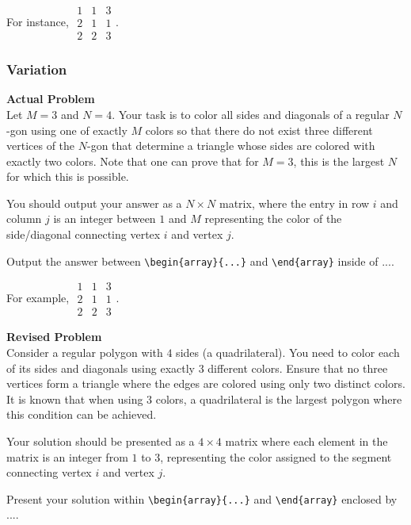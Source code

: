 For instance, $\boxed{\begin{array}{ccc}1 & 1 & 3 \\ 2 & 1 & 1 \\ 2 & 2 & 3\end{array}}$.

\subsubsection{Variation}
\textbf{Actual Problem}\\
Let $M = 3$ and $N = 4$. Your task is to color all sides and diagonals of a regular $N$-gon using one of exactly $M$ colors so that there do not exist three different vertices of the $N$-gon
that determine a triangle whose sides are colored with exactly two colors.
Note that one can prove that for $M = 3$, this is the largest $N$ for which this is possible.


You should output your answer as a ${N} \times {N}$ matrix, where the entry in row $i$ and column $j$ is an integer between $1$ and $M$ representing the color of the side/diagonal connecting vertex $i$ and vertex $j$.
 
Output the answer between \verb|\begin{array}{...}| and \verb|\end{array}| inside of $\boxed{...}$. 

For example, $\boxed{\begin{array}{ccc}1 & 1 & 3 \\ 2 & 1 & 1 \\ 2 & 2 & 3\end{array}}$.

\textbf{Revised Problem}\\
Consider a regular polygon with $4$ sides (a quadrilateral). You need to color each of its sides and diagonals using exactly $3$ different colors. Ensure that no three vertices form a triangle where the edges are colored using only two distinct colors. It is known that when using 3 colors, a quadrilateral is the largest polygon where this condition can be achieved.

Your solution should be presented as a $4 \times 4$ matrix where each element in the matrix is an integer from $1$ to $3$, representing the color assigned to the segment connecting vertex $i$ and vertex $j$.

Present your solution within \verb|\begin{array}{...}| and \verb|\end{array}| enclosed by $\boxed{...}$. 

